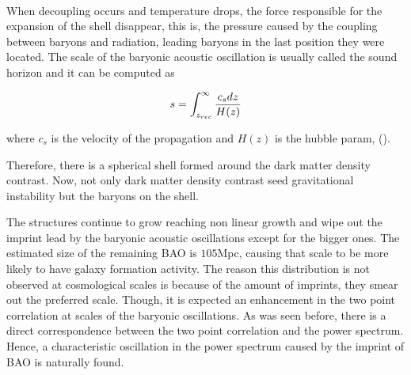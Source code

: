 \

When decoupling occurs and temperature drops, the force responsible for the expansion of the shell disappear, this is, 
the pressure caused by the coupling between baryons and radiation, leading baryons in the last position they were located. 
The scale of the baryonic acoustic oscillation is 
usually called the sound horizon and it can be computed as

\[  
s = \int_{z_{rec}}^{\infty} \frac{c_s dz}{H(z)}
\]


where $c_s$ is the velocity of the propagation and $H(z)$ is the hubble param, (\cite{pilar}). 

Therefore, there is a spherical shell formed 
around the dark matter density contrast. Now, not only dark matter density contrast seed gravitational instability but 
the baryons on the shell. 

The structures continue to grow reaching non linear growth and wipe out the imprint lead by the baryonic acoustic
oscillations except for the bigger ones. The estimated size of the remaining BAO is $105$Mpc, causing that scale to 
be more likely to have galaxy formation activity. The reason this distribution is not observed at cosmological scales is because
of the amount of imprints, they smear out the preferred scale. Though, it is expected an enhancement in the two point
correlation at scales of the baryonic oscillations. As was seen before, there is a direct correspondence between the 
two point correlation and the power spectrum. Hence, a characteristic oscillation in the power spectrum caused by the imprint of BAO is naturally found. 	

